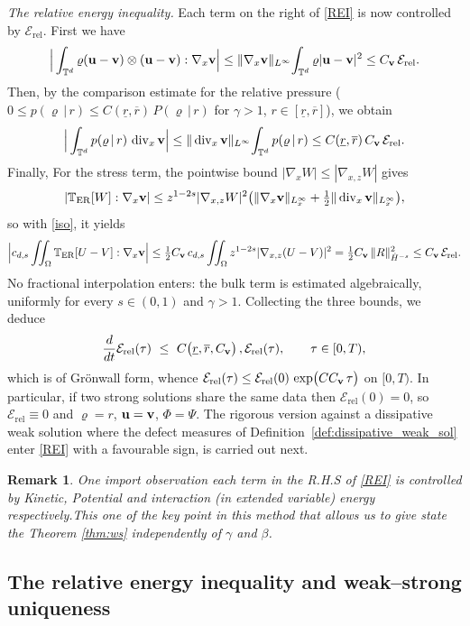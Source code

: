 \documentclass[12pt,a4paper,twoside]{article}
\newcommand{\vr}{\varrho}
\newcommand{\vu}{\vc{u}}
\newcommand{\vv}{\vc{v}}
\newcommand{\vc}[1]{{\bf #1}}
\newcommand{\Erel}{\mathcal{E}_{\mathrm{rel}}}
\newcommand{\Cv}{C_{\vv}}
\newtheorem{rmk}{Remark}
\numberwithin{equation}{section}%
\newcommand{\T}{\mathbb{T}}
\newcommand{\Gradx}{\nabla_x}
\newcommand{\Gradxz}{\nabla_{x,z}}
\newcommand{\Divx}{\operatorname{div}_x}
\begin{document}
\emph{The relative energy inequality.}
Each term on the right of \eqref{REI} is now controlled by $\Erel$. 
First we have
\[
\Big|\int_{\mathbb T^d}\vr(\vu-\vv)\otimes(\vu-\vv):\Gradx\vv\Big|
\le\|\Gradx\vv\|_{L^\infty}\!\int_{\mathbb T^d}\vr|\vu-\vv|^2\le \Cv\,\Erel .
\]
Then, by the comparison estimate for the relative pressure ($0\le p(\vr\,|\,r)\le C(\underline r,\overline r)\,P(\vr\,|\,r)$ for $\gamma>1$, $r\in[\underline r,\overline r]$), we obtain
\[
\Big|\int_{\mathbb T^d} p(\vr\,|\,r)\,\Divx\vv\Big|
\le\|\Divx\vv\|_{L^\infty}\!\int_{\mathbb T^d} p(\vr\,|\,r)
\le C(\underline r,\overline r)\,\Cv\,\Erel .
\]
Finally, For the stress term, the pointwise bound $|\Gradx W|\le|\Gradxz W|$ gives $$|\T_{\rm ER}[W]:\Gradx\vv|\le z^{1-2s}|\Gradxz W|^2\big(\|\Gradx\vv\|_{L^\infty_x}+\tfrac12\|\Divx\vv\|_{L^\infty_x}\big),$$ so with \eqref{iso}, it yields
\[
\Big|c_{d,s}\iint_\Omega \T_{\rm ER}[U-V]:\Gradx\vv\Big|
\le \tfrac12\Cv\, c_{d,s}\iint_\Omega z^{1-2s}|\Gradxz(U-V)|^2
= \tfrac12\Cv\,\|R\|_{\dot H^{-s}}^2\le \Cv\,\Erel .
\]
No fractional interpolation enters: the bulk term is estimated algebraically, uniformly for every $s\in(0,1)$ and $\gamma>1$. Collecting the three bounds, we deduce 
\begin{equation}\label{gron}
	\frac{d}{dt}\Erel(\tau)\ \le\ C\big(\underline r,\overline r,\Cv\big)\,,\Erel(\tau),
	\qquad \tau\in[0,T),
\end{equation}
which is of Gr\"onwall form, whence $\Erel(\tau)\le \Erel(0)\,\exp\!\big(C\Cv\,\tau\big)$ on $[0,T)$. In particular, if two strong solutions share the same data then $\Erel(0)=0$, so $\Erel\equiv0$ and $\vr=r$, $\vu=\vv$, $\Phi=\Psi$. The rigorous version against a dissipative weak solution where the defect measures of Definition~\ref{def:dissipative_weak_sol} enter \eqref{REI} with a favourable sign, is carried out next. 
\begin{rmk}
	One import observation each term in the R.H.S of \eqref{REI} is controlled by Kinetic, Potential and interaction (in extended variable) energy respectively.This one of the key point in this method that allows us to give state the Theorem \ref{thm:ws} independently of $\gamma$ and $\beta$.
\end{rmk}

	
	
	

	
	\subsection{The relative energy inequality and weak--strong uniqueness}
	\label{sec:REI-rigorous}
	
\end{document}
